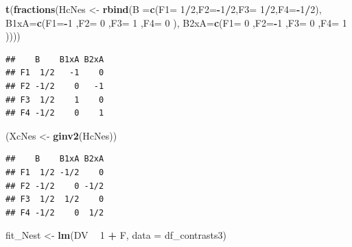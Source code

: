 \documentclass[12pt,]{krantz}
\newenvironment{Shaded}{\begin{snugshade}}{\end{snugshade}}
\newcommand{\DataTypeTok}[1]{\textcolor[rgb]{0.13,0.29,0.53}{#1}}
\newcommand{\DecValTok}[1]{\textcolor[rgb]{0.00,0.00,0.81}{#1}}
\newcommand{\KeywordTok}[1]{\textcolor[rgb]{0.13,0.29,0.53}{\textbf{#1}}}
\newcommand{\NormalTok}[1]{#1}
\newcommand{\OperatorTok}[1]{\textcolor[rgb]{0.81,0.36,0.00}{\textbf{#1}}}
\newcommand{\StringTok}[1]{\textcolor[rgb]{0.31,0.60,0.02}{#1}}
\begin{document}
\begin{Shaded}
\begin{Highlighting}[]
\KeywordTok{t}\NormalTok{(}\KeywordTok{fractions}\NormalTok{(HcNes <-}\StringTok{ }\KeywordTok{rbind}\NormalTok{(}\DataTypeTok{B   =}\KeywordTok{c}\NormalTok{(}\DataTypeTok{F1=} \DecValTok{1}\OperatorTok{/}\DecValTok{2}\NormalTok{,}\DataTypeTok{F2=}\OperatorTok{-}\DecValTok{1}\OperatorTok{/}\DecValTok{2}\NormalTok{,}\DataTypeTok{F3=} \DecValTok{1}\OperatorTok{/}\DecValTok{2}\NormalTok{,}\DataTypeTok{F4=}\OperatorTok{-}\DecValTok{1}\OperatorTok{/}\DecValTok{2}\NormalTok{),}
                           \DataTypeTok{B1xA=}\KeywordTok{c}\NormalTok{(}\DataTypeTok{F1=}\OperatorTok{-}\DecValTok{1}\NormalTok{  ,}\DataTypeTok{F2=} \DecValTok{0}\NormalTok{  ,}\DataTypeTok{F3=} \DecValTok{1}\NormalTok{  ,}\DataTypeTok{F4=} \DecValTok{0}\NormalTok{  ),}
                           \DataTypeTok{B2xA=}\KeywordTok{c}\NormalTok{(}\DataTypeTok{F1=} \DecValTok{0}\NormalTok{  ,}\DataTypeTok{F2=}\OperatorTok{-}\DecValTok{1}\NormalTok{  ,}\DataTypeTok{F3=} \DecValTok{0}\NormalTok{  ,}\DataTypeTok{F4=} \DecValTok{1}\NormalTok{ ))))}
\end{Highlighting}
\end{Shaded}

\begin{verbatim}
##    B    B1xA B2xA
## F1  1/2   -1    0
## F2 -1/2    0   -1
## F3  1/2    1    0
## F4 -1/2    0    1
\end{verbatim}

\begin{Shaded}
\begin{Highlighting}[]
\NormalTok{(XcNes <-}\StringTok{ }\KeywordTok{ginv2}\NormalTok{(HcNes))}
\end{Highlighting}
\end{Shaded}

\begin{verbatim}
##    B    B1xA B2xA
## F1  1/2 -1/2    0
## F2 -1/2    0 -1/2
## F3  1/2  1/2    0
## F4 -1/2    0  1/2
\end{verbatim}

\begin{Shaded}
\end{Shaded}

\begin{Shaded}
\begin{Highlighting}[]
\NormalTok{fit_Nest <-}\StringTok{ }\KeywordTok{lm}\NormalTok{(DV }\OperatorTok{~}\StringTok{ }\DecValTok{1} \OperatorTok{+}\StringTok{ }\NormalTok{F,}
                 \DataTypeTok{data =}\NormalTok{ df_contrasts3) }
\end{Highlighting}
\end{Shaded}
\end{document}
